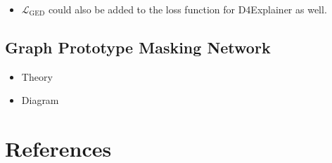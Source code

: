 \documentclass[
  11pt,
  letterpaper,
]{article}
\providecommand{\tightlist}{%
  \setlength{\itemsep}{0pt}\setlength{\parskip}{0pt}}\usepackage{longtable,booktabs,array}
\begin{document}
\begin{itemize}
\tightlist
\item
  \(\mathcal{L}_{\text{GED}}\) could also be added to the loss function
  for D4Explainer as well.
\end{itemize}

\hypertarget{graph-prototype-masking-network}{%
\subsection{Graph Prototype Masking
Network}\label{graph-prototype-masking-network}}

\begin{itemize}
\item
  Theory
\item
  Diagram
\end{itemize}

\pagebreak

\hypertarget{references}{%
\section*{References}\label{references}}
\end{document}
